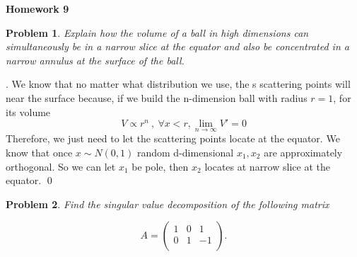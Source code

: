 \documentclass[12pt]{article}
\date{Feb 14, 2012}
\newtheorem{hw}{Problem}
\newenvironment{sol}
  {\par\vspace{3mm}\noindent{\it Solution}.}
  {\qed}
\begin{document}
\begin{center}
{\LARGE\bf Homework 9}\\
\vspace{2mm}
\end{center}

\begin{hw}
Explain how the volume of a ball in high dimensions can simultaneously be in a narrow slice at the equator and also be concentrated in a narrow annulus at the surface of the ball.
\end{hw}

\begin{sol}
\renewcommand{\qedsymbol}{}
We know that no matter what distribution we use, the s scattering points will near the surface because, if we build the n-dimension ball with radius $r=1$, for its volume
$$V \propto r^{n}\ ,\ \forall x<r, \lim_{n\rightarrow \infty }V'=0 $$  
Therefore, we just need to let the scattering points locate at the equator.
We know that once $x\sim N(0,1)$ random d-dimensional $x_1,x_2$ are approximately
 orthogonal. So we can let $x_{1}$ be pole, then $x_{2}$ locates at narrow slice at the equator.
\end{sol}

\begin{hw}
Find the singular value decomposition of the following matrix

$$A=\left(
  \begin{array}{ccc}
    1 & 0 & 1 \\
    0 & 1 & -1 \\
  \end{array}
\right).$$
\end{hw}
\end{document}
